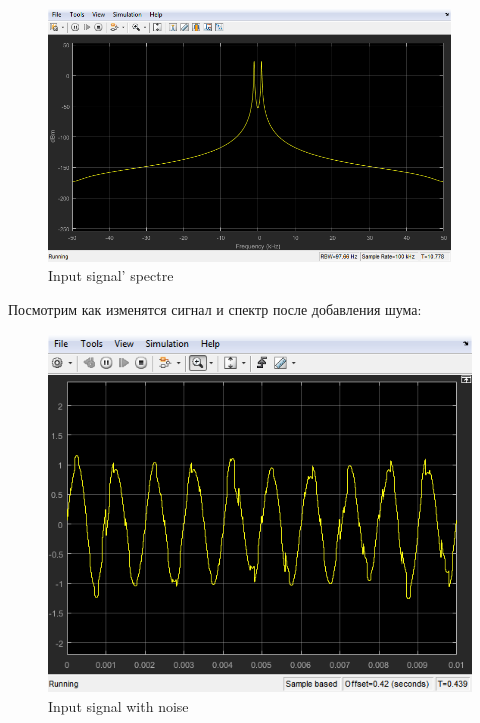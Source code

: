 \documentclass[a4paper,14pt]{extarticle}
\begin{document}
\begin{figure}[H]
    \centering
    \includegraphics[width=0.95\textwidth]{input_sp}
	\captionsetup{justification=centering,margin=1cm}
    \caption{Input signal' spectre}
    \label{fig:input_sp}
\end{figure}
Посмотрим как изменятся сигнал и спектр после добавления шума:
\begin{figure}[H]
    \centering
    \includegraphics{noise}
	\captionsetup{justification=centering,margin=1cm}
    \caption{Input signal with noise}
    \label{fig:noise}
\end{figure}
\end{document}
